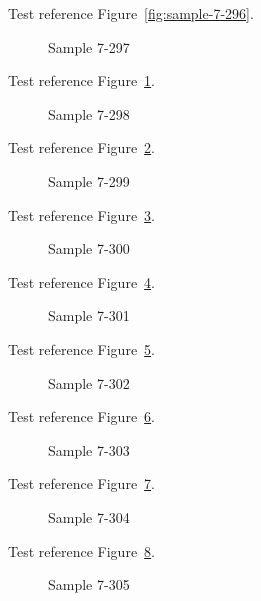 Test reference Figure~\ref{fig:sample-7-296}.

\begin{figure}[tbhp]
\caption{Sample 7-297}
\label{fig:sample-7-297}
\end{figure}

Test reference Figure~\ref{fig:sample-7-297}.

\begin{figure}[tbhp]
\caption{Sample 7-298}
\label{fig:sample-7-298}
\end{figure}

Test reference Figure~\ref{fig:sample-7-298}.

\begin{figure}[tbhp]
\caption{Sample 7-299}
\label{fig:sample-7-299}
\end{figure}

Test reference Figure~\ref{fig:sample-7-299}.

\begin{figure}[tbhp]
\caption{Sample 7-300}
\label{fig:sample-7-300}
\end{figure}

Test reference Figure~\ref{fig:sample-7-300}.

\begin{figure}[tbhp]
\caption{Sample 7-301}
\label{fig:sample-7-301}
\end{figure}

Test reference Figure~\ref{fig:sample-7-301}.

\begin{figure}[tbhp]
\caption{Sample 7-302}
\label{fig:sample-7-302}
\end{figure}

Test reference Figure~\ref{fig:sample-7-302}.

\begin{figure}[tbhp]
\caption{Sample 7-303}
\label{fig:sample-7-303}
\end{figure}

Test reference Figure~\ref{fig:sample-7-303}.

\begin{figure}[tbhp]
\caption{Sample 7-304}
\label{fig:sample-7-304}
\end{figure}

Test reference Figure~\ref{fig:sample-7-304}.

\begin{figure}[tbhp]
\caption{Sample 7-305}
\label{fig:sample-7-305}
\end{figure}

